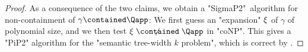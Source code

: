 \begin{proof}
  As a consequence of the two claims, we obtain a "SigmaP2"~algorithm for non-containment of $\gamma \contained \Qapp$: We first guess an "expansion" $\xi$ of $\gamma$ of polynomial size, and we then test $\anexpansion \centernot{\contained} \Qapp$ in "coNP". This gives a {"PiP2"} algorithm for the "semantic tree-width $k$ problem", which is correct by
  .
\end{proof}